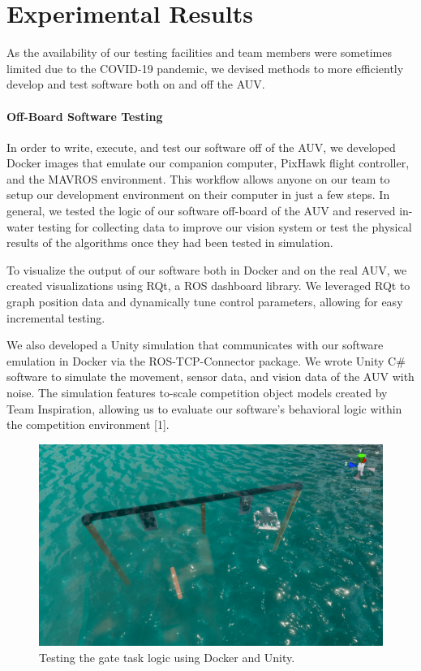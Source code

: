 \documentclass[conference]{IEEEtran}
\begin{document}
\section{Experimental Results}
As the availability of our testing facilities and team members were sometimes limited due to the COVID-19 pandemic, we devised methods to more efficiently develop and test software both on and off the AUV.


    \paragraph{Off-Board Software Testing}
    In order to write, execute, and test our software off of the AUV, we developed Docker images that emulate our companion computer, PixHawk flight controller, and the MAVROS environment. This workflow allows anyone on our team to setup our development environment on their computer in just a few steps. In general, we tested the logic of our software off-board of the AUV and reserved in-water testing for collecting data to improve our vision system or test the physical results of the algorithms once they had been tested in simulation.

    To visualize the output of our software both in Docker and on the real AUV, we created visualizations using RQt, a ROS dashboard library. We leveraged RQt to graph position data and dynamically tune control parameters, allowing for easy incremental testing.
    
    We also developed a Unity simulation that communicates with our software emulation in Docker via the 
    ROS-TCP-Connector package. We wrote Unity C\# software to simulate the movement, sensor data, and vision data of the AUV with noise. The simulation features to-scale competition object models created by Team Inspiration, allowing us to evaluate our software's behavioral logic within the competition environment [1].
    
    \begin{figure}[htbp]
    \centerline{\includegraphics[scale=0.3]{images/unity.png}}
    \caption{Testing the gate task logic using Docker and Unity.}
    \label{fig}
    \end{figure}
\end{document}
